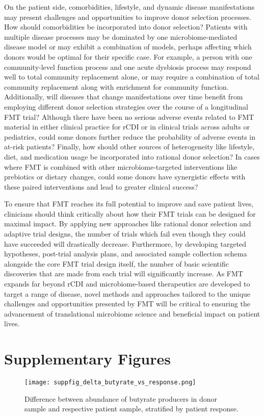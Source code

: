 On the patient side, comorbidities, lifestyle, and dynamic disease manifestations may present challenges and opportunities to improve donor selection processes.
How should comorbidities be incorporated into donor selection?
Patients with multiple disease processes may be dominated by one microbiome-mediated disease model or may exhibit a combination of models, perhaps affecting which donors would be optimal for their specific case.
For example, a person with one community-level function process and one acute dysbiosis process may respond well to total community replacement alone, or may require a combination of total community replacement along with enrichment for community function.
Additionally, will diseases that change manifestations over time benefit from employing different donor selection strategies over the course of a longitudinal FMT trial?
Although there have been no serious adverse events related to FMT material in either clinical practice for rCDI or in clinical trials across adults or pediatrics, could some donors further reduce the probability of adverse events in at-risk patients?
Finally, how should other sources of heterogeneity like lifestyle, diet, and medication usage be incorporated into rational donor selection?
In cases where FMT is combined with other microbiome-targeted interventions like prebiotics or dietary changes, could some donors have synergistic effects with these paired interventions and lead to greater clinical success?

To ensure that FMT reaches its full potential to improve and save patient lives, clinicians should think critically about how their FMT trials can be designed for maximal impact.
By applying new approaches like rational donor selection and adaptive trial designs, the number of trials which fail even though they could have succeeded will drastically decrease.
Furthermore, by developing targeted hypotheses, post-trial analysis plans, and associated sample collection schema alongside the core FMT trial design itself, the number of basic scientific discoveries that are made from each trial will significantly increase.
As FMT expands far beyond rCDI and microbiome-based therapeutics are developed to target a range of disease, novel methods and approaches tailored to the unique challenges and opportunities presented by FMT will be critical to ensuring the advancement of translational microbiome science and beneficial impact on patient lives.


\section{Supplementary Figures}
\FloatBarrier
\begin{figure}[h]
    \begin{center}
    \texttt{[image: suppfig\_delta\_butyrate\_vs\_response.png]}
    \caption{Difference between abundance of butyrate producers in donor sample and respective patient sample, stratified by patient response.}\label{fig:delta-butyrate}
    \end{center}
\end{figure}

\begin{singlespace}


\end{singlespace}
